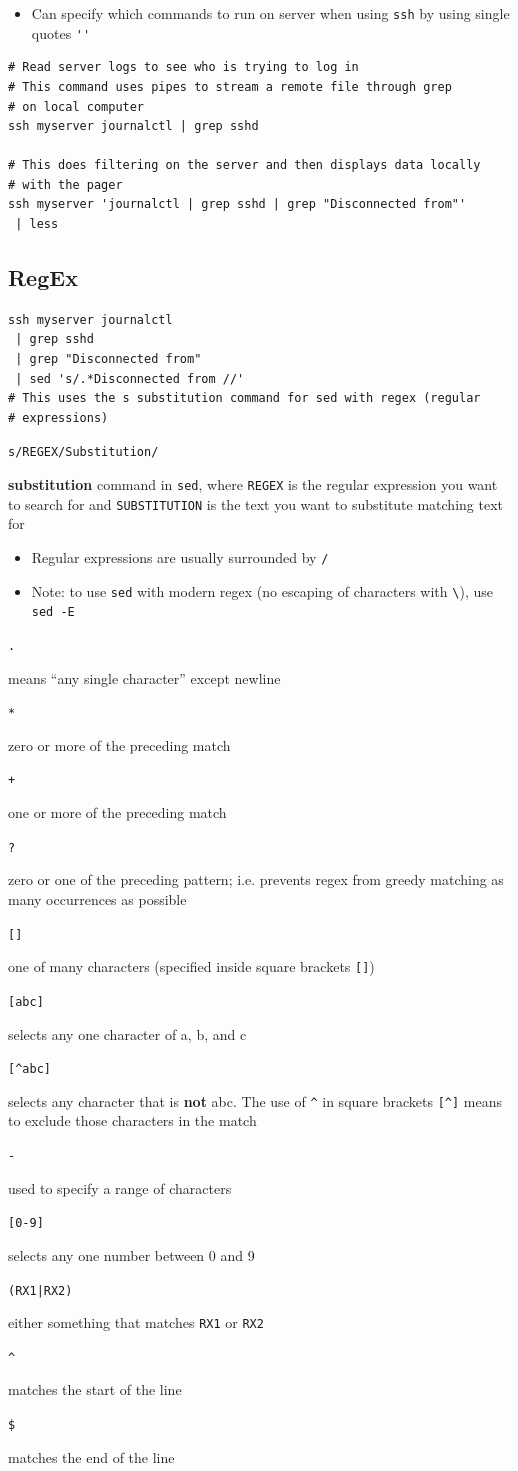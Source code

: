 \documentclass[letterpaper,12pt]{article}
\newcommand*{\lstitem}[1]{
  \setbox0\hbox{\lstinline{#1}}
  \item[\usebox0]
}
\begin{document}
\begin{itemize}
 \item Can specify which commands to run on server when using \lstinline{ssh} by using single quotes \lstinline{''}
\end{itemize}

\begin{lstlisting}
# Read server logs to see who is trying to log in
# This command uses pipes to stream a remote file through grep
# on local computer
ssh myserver journalctl | grep sshd

# This does filtering on the server and then displays data locally
# with the pager
ssh myserver 'journalctl | grep sshd | grep "Disconnected from"'
 | less
\end{lstlisting}

\subsection{RegEx}

\begin{lstlisting}
ssh myserver journalctl
 | grep sshd
 | grep "Disconnected from"
 | sed 's/.*Disconnected from //'
# This uses the s substitution command for sed with regex (regular
# expressions)
\end{lstlisting}

\begin{description}
 \lstitem{s/REGEX/Substitution/} \textbf{substitution} command in \lstinline{sed}, where \lstinline{REGEX} is the regular expression you want to search for and \lstinline{SUBSTITUTION} is the text you want to substitute matching text for
\end{description}

\begin{itemize}
 \item Regular expressions are usually surrounded by \lstinline{/}
 \item Note: to use \lstinline{sed} with modern regex (no escaping of characters with \lstinline{\}), use \lstinline{sed -E}
\end{itemize}

\begin{description}
 \lstitem{.} means “any single character” except newline
 \lstitem{*} zero or more of the preceding match
 \lstitem{+} one or more of the preceding match
 \lstitem{?} zero or one of the preceding pattern; i.e. prevents regex from greedy matching as many occurrences as possible
 \lstitem{[]} one of many characters (specified inside square brackets \lstinline{[]})
 \lstitem{[abc]} selects any one character of a, b, and c
 \lstitem{[^abc]} selects any character that is \textbf{not} abc. The use of \lstinline{^} in square brackets \lstinline{[^]} means to exclude those characters in the match
 \lstitem{-} used to specify a range of characters
 \lstitem{[0-9]} selects any one number between 0 and 9
 \lstitem{(RX1|RX2)} either something that matches \lstinline{RX1} or \lstinline{RX2}
 \lstitem{^} matches the start of the line
 \lstitem{$} matches the end of the line
\end{description}
\end{document}
